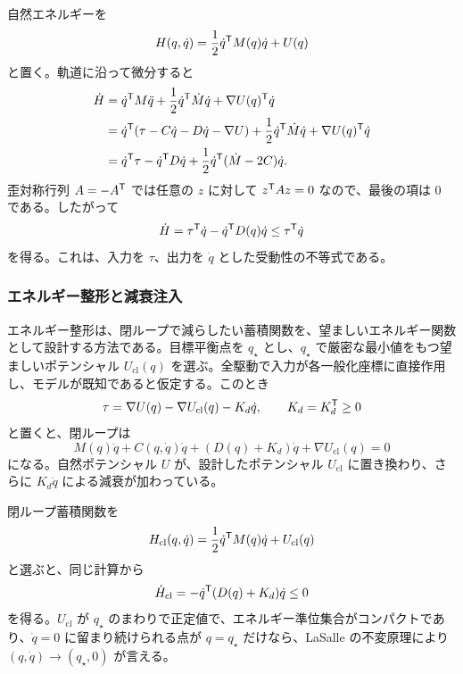 自然エネルギーを
\begin{equation}
  H(q,\dot{q})
  =
  \frac{1}{2}\dot{q}^{\mathsf{T}} M(q)\dot{q}+U(q)
\end{equation}
と置く。軌道に沿って微分すると
\begin{align}
  \dot{H}
  &=
  \dot{q}^{\mathsf{T}} M\ddot{q}
  +\frac{1}{2}\dot{q}^{\mathsf{T}} \dot{M}\dot{q}
  +\nabla U(q)^{\mathsf{T}} \dot{q}\\
  &=
  \dot{q}^{\mathsf{T}}(\tau-C\dot{q}-D\dot{q}-\nabla U)
  +\frac{1}{2}\dot{q}^{\mathsf{T}} \dot{M}\dot{q}
  +\nabla U(q)^{\mathsf{T}} \dot{q}\\
  &=
  \dot{q}^{\mathsf{T}}\tau
  -\dot{q}^{\mathsf{T}} D\dot{q}
  +\frac{1}{2}\dot{q}^{\mathsf{T}}(\dot{M}-2C)\dot{q}.
\end{align}
歪対称行列 $A=-A^{\mathsf{T}}$ では任意の $z$ に対して $z^{\mathsf{T}} A z=0$ なので、最後の項は 0 である。したがって
\begin{equation}
  \dot{H}
  =
  \tau^{\mathsf{T}} \dot{q}-\dot{q}^{\mathsf{T}} D(q)\dot{q}
  \le
  \tau^{\mathsf{T}} \dot{q}
\end{equation}
を得る。これは、入力を $\tau$、出力を $\dot{q}$ とした受動性の不等式である。

\subsubsection{エネルギー整形と減衰注入}

エネルギー整形は、閉ループで減らしたい蓄積関数を、望ましいエネルギー関数として設計する方法である。目標平衡点を $q_\star$ とし、$q_\star$ で厳密な最小値をもつ望ましいポテンシャル $U_\mathrm{cl}(q)$ を選ぶ。全駆動で入力が各一般化座標に直接作用し、モデルが既知であると仮定する。このとき
\begin{equation}
  \tau
  =
  \nabla U(q)-\nabla U_\mathrm{cl}(q)-K_d\dot{q},
  \qquad
  K_d=K_d^{\mathsf{T}} \ge0
\end{equation}
と置くと、閉ループは
\begin{equation}
  M(q)\ddot{q}+C(q,\dot{q})\dot{q}
  +(D(q)+K_d)\dot{q}
  +\nabla U_\mathrm{cl}(q)=0
\end{equation}
になる。自然ポテンシャル $U$ が、設計したポテンシャル $U_\mathrm{cl}$ に置き換わり、さらに $K_d\dot{q}$ による減衰が加わっている。

閉ループ蓄積関数を
\begin{equation}
  H_\mathrm{cl}(q,\dot{q})
  =
  \frac{1}{2}\dot{q}^{\mathsf{T}} M(q)\dot{q}+U_\mathrm{cl}(q)
\end{equation}
と選ぶと、同じ計算から
\begin{equation}
  \dot{H}_\mathrm{cl}
  =
  -\dot{q}^{\mathsf{T}}(D(q)+K_d)\dot{q}
  \le0
\end{equation}
を得る。$U_\mathrm{cl}$ が $q_\star$ のまわりで正定値で、エネルギー準位集合がコンパクトであり、$\dot{q}=0$ に留まり続けられる点が $q=q_\star$ だけなら、LaSalle の不変原理により $(q,\dot{q})\to(q_\star,0)$ が言える。

